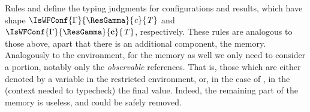Rules  and  define the typing  judgments for configurations and results, which have shape $\IsWFConf{\Gamma}{\ResGamma}{\conf}{\T}$ and 
$\IsWFConf{\Gamma}{\ResGamma}{\vconf}{\T}$, respectively. 
These rules are analogous to those above, apart that there is an additional component, the memory. Analogously to the environment, for the memory as well we only need to consider a portion, notably only the \emph{observable} references. That is, those which are either denoted by a variable in the restricted environment, or, in the case of , in the (context needed to typecheck) the final value. Indeed, the remaining part of the memory is useless, and could be safely removed. 









